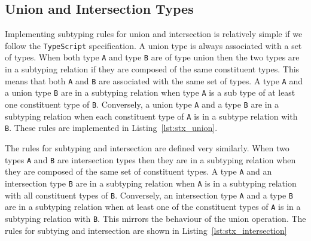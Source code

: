 \documentclass{article}
\newcommand{\ttt}[1]{\texttt{#1}}
\begin{document}
\subsection{Union and Intersection Types}
Implementing subtyping rules for union and intersection is relatively simple if we follow the \ttt{TypeScript} specification.
A union type is always associated with a set of types.
When both type \ttt{A} and type \ttt{B} are of type union then the two types are in a subtyping relation if they are composed of the same constituent types.
This means that both \ttt{A} and \ttt{B} are associated with the same set of types.
A type \ttt{A} and a union type \ttt{B} are in a subtyping relation when type \ttt{A} is a sub type of at least one constituent type of \ttt{B}.
Conversely, a union type \ttt{A} and a type \ttt{B} are in a subtyping relation when each constituent type of \ttt{A} is in a subtype relation with \ttt{B}.
These rules are implemented in Listing~\ref{lst:stx_union}.
\noindent
\begin{center}
    \begin{minipage}{.85\textwidth}
    
    \end{minipage}
\end{center}
The rules for subtyping and intersection are defined very similarly.
When two types \ttt{A} and \ttt{B} are intersection types then they are in a subtyping relation when they are composed of the same set of constituent types.
A type \ttt{A} and an intersection type \ttt{B} are in a subtyping relation when \ttt{A} is in a subtyping relation with all constituent types of \ttt{B}.
Conversely, an intersection type \ttt{A} and a type \ttt{B} are in a subtyping relation when at least one of the constituent types of \ttt{A} is in a subtyping relation with \ttt{B}.
This mirrors the behaviour of the union operation.
The rules for subtying and intersection are shown in Listing~\ref{lst:stx_intersection}
\noindent
\begin{center}
    \begin{minipage}{\textwidth}
    
    \end{minipage}
\end{center}
\end{document}

